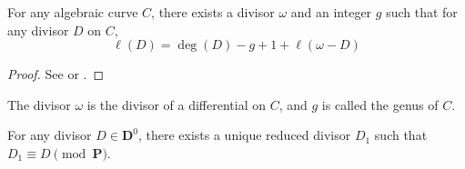 \begin{theorem}
\label{theorem:Riemann-Roch}
For any algebraic curve $C$, there exists a divisor $\omega$ and an integer $g$ such that for any 
divisor $D$ on $C$,
$$
\ell(D) = \deg(D) - g + 1 + \ell(\omega - D)
$$
\end{theorem}
\begin{proof}
See \cite[ch. 1]{Lang1982} or \cite[ch. 12]{Bump1998}.
\end{proof}
\begin{remark}
The divisor $\omega$ is the divisor of a differential on $C$, and $g$ is called the genus of $C$.
\end{remark}
\begin{theorem}
\label{theorem:unique-redu}
For any divisor $D \in \mathbf{D}^0$, there exists a unique reduced divisor $D_1$ such that $D_1 
\equiv D \pmod {\mathbf{P}}$.
\end{theorem}
